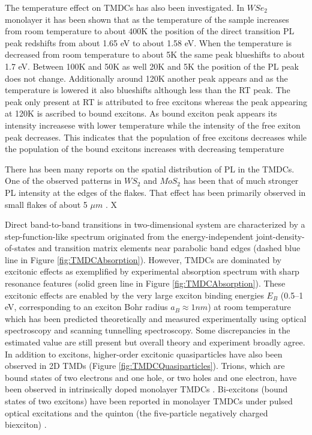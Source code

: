 	The temperature effect on TMDCs has also been investigated. In $WSe_2$ monolayer it has been shown that as the temperature of the sample increases from room temperature to about 400K the position of the direct transition PL peak redshifts from about 1.65 eV to about 1.58 eV. When the temperature is decreased from room temperature to about 5K the same peak blueshifts to about 1.7 eV. Between 100K and 50K as well 20K and 5K the position of the PL peak does not change. Additionally around 120K another peak appears and as the temperature is lowered it also blueshifts although less than the RT peak. The peak only present at RT is attributed to free excitons whereas the peak appearing at 120K is ascribed to bound excitons. As bound exciton peak appears its intensity increasese with lower temperature while the intensity of the free exiton peak decreases. This indicates that the population of free excitons decreases while the population of the bound excitons increases with decreasing temperature \cite{PhotoluminescencePropertiesAndExcitonDynamicsInMonolayerWSe2}
	
	There has been many reports on the spatial distribution of PL in the TMDCs. One of the observed patterns in $WS_2$ and $MoS_2$ has been that of much stronger PL intensity at the edges of the flakes. That effect has been primarily observed in small flakes of about 5 $\mu m$ \cite{ExtraordinaryRoomTemperaturePhotoluminescenceInTriangularWS2Monolayers}. X

Direct band-to-band transitions in two-dimensional system are characterized by a step-function-like spectrum originated from the energy-independent joint-density-of-states and transition matrix elements near parabolic band edges \cite{Haug1994} (dashed blue line in Figure \ref{fig:TMDCAbsorption}). However, TMDCs  are dominated by excitonic effects as exemplified by experimental absorption spectrum with sharp resonance features \cite{EmergingPhotoluminescenceInMonolayerMoS2} (solid green line in Figure \ref{fig:TMDCAbsorption}). These excitonic effects are enabled by the very large exciton binding energies $E_B$ (0.5–1 eV, corresponding to an exciton Bohr radius $a_B \approx 1 nm$) at room temperature which has been predicted theoretically and measured experimentally using optical spectroscopy and scanning tunnelling spectroscopy. Some discrepancies in the estimated value are still present but overall theory and experiment broadly agree. 
In addition to excitons, higher-order excitonic quasiparticles have also been observed in 2D TMDs (Figure \ref{fig:TMDCQuasiparticles}). Trions, which are bound states of two electrons and one hole, or two holes and one electron, have been observed in intrinsically doped monolayer TMDCs \cite{Mak2012}\cite{Ross2013}. Bi-excitons (bound states of two excitons) have been reported in monolayer TMDCs under pulsed optical excitations \cite{doi:10.1021/nn5059908}\cite{You2015} and the quinton (the five-particle negatively charged biexciton) \cite{Barbone2018}.
 
